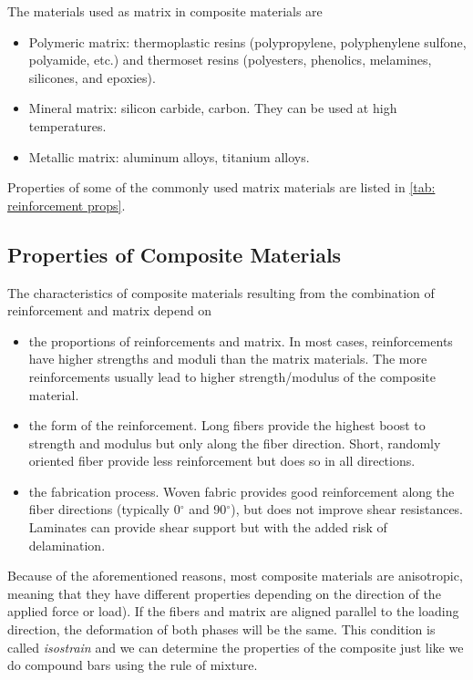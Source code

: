 \documentclass[
10pt,
a4paper,
openany,
svgnames,
]{book}
\begin{document}
The materials used as matrix in composite materials are

\begin{itemize}
\item Polymeric matrix: thermoplastic resins (polypropylene, polyphenylene sulfone, polyamide, etc.) and thermoset resins (polyesters, phenolics, melamines, silicones, and epoxies).
\item Mineral matrix: silicon carbide, carbon. They can be used at high temperatures.
\item Metallic matrix: aluminum alloys, titanium alloys.
\end{itemize}

Properties of some of the commonly used matrix materials are listed in \cref{tab: reinforcement props}.

\subsection{Properties of Composite Materials}

The characteristics of composite materials resulting from the combination of reinforcement and matrix depend on

\begin{itemize}
\item the proportions of reinforcements and matrix. In most cases, reinforcements have higher strengths and moduli than the matrix materials. The more reinforcements usually lead to higher strength/modulus of the composite material.
\item the form of the reinforcement. Long fibers provide the highest boost to strength and modulus but only along the fiber direction. Short, randomly oriented fiber provide less reinforcement but does so in all directions.
\item the fabrication process. Woven fabric provides good reinforcement along the fiber directions (typically 0$^{\circ}$ and 90$^{\circ}$), but does not improve shear resistances. Laminates can provide shear support but with the added risk of delamination.
\end{itemize}

Because of the aforementioned reasons, most composite materials are anisotropic, meaning that they have different properties depending on the direction of the applied force or load). If the fibers and matrix are aligned parallel to the loading direction, the deformation of both phases will be the same. This condition is called \emph{isostrain} and we can determine the properties of the composite just like we do compound bars using the rule of mixture.
\end{document}
